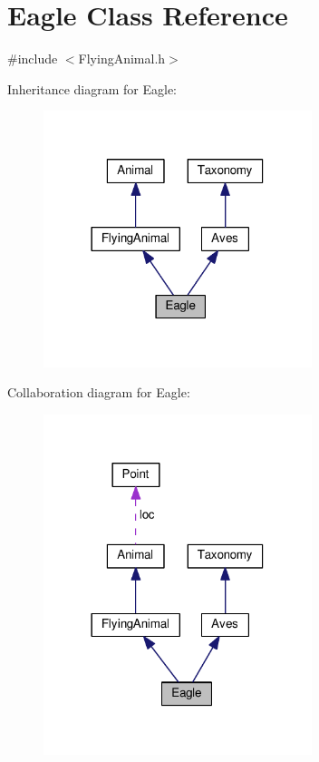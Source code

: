 \hypertarget{classEagle}{}\section{Eagle Class Reference}
\label{classEagle}


{\ttfamily \#include $<$Flying\+Animal.\+h$>$}



Inheritance diagram for Eagle\+:
\nopagebreak
\begin{figure}[H]
\begin{center}
\leavevmode
\includegraphics[width=222pt]{classEagle__inherit__graph}
\end{center}
\end{figure}


Collaboration diagram for Eagle\+:
\nopagebreak
\begin{figure}[H]
\begin{center}
\leavevmode
\includegraphics[width=222pt]{classEagle__coll__graph}
\end{center}
\end{figure}
